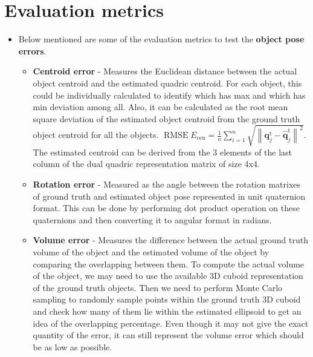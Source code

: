 \documentclass[report.tex]{subfiles}
\begin{document}
    \section{Evaluation metrics}
    \begin{itemize}

\item Below mentioned are some of the evaluation metrics to test the \textbf{object pose errors}.
\begin{itemize}
    \item \textbf{Centroid error} - Measures the Euclidean distance between the actual object centroid and the estimated quadric centroid. For each object, this could be individually calculated to identify which has max and which has min deviation among all. Also, it can be calculated as the root mean square deviation of the estimated object centroid from the ground truth object centroid for all the objects. $\operatorname{RMSE} E_{\mathrm{cen}}=\frac{1}{n} \sum_{i=1}^{n} \sqrt{\left\|\mathbf{q}_{j}^{\mathrm{t}}-\hat{\mathbf{q}}_{j}^{\mathrm{t}}\right\|^{2}}$. The estimated centroid can be derived from the 3 elements of the last column of the dual quadric representation matrix of size 4x4.\cite{sünderhauf2017dual}
    \item \textbf{Rotation error} - Measured as the angle between the rotation matrixes of ground truth and estimated object pose represented in unit quaternion format. This can be done by performing dot product operation on these quaternions and then converting it to angular format in radians.
    \item \textbf{Volume error} - Measures the difference between the actual ground truth volume of the object and the estimated volume of the object by comparing the overlapping between them. To compute the actual volume of the object, we may need to use the available 3D cuboid representation of the ground truth objects. Then we need to perform Monte Carlo sampling to randomly sample points within the ground truth 3D cuboid and check how many of them lie within the estimated ellipsoid to get an idea of the overlapping percentage. Even though it may not give the exact quantity of the error, it can still represent the volume error which should be as low as possible.
\end{itemize}


\end{itemize}
\end{document}

